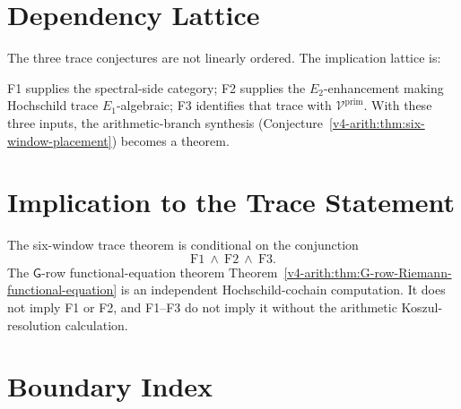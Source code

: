 \section{Dependency Lattice}
\label{v4-arith:of:dependency-graph}

The three trace conjectures are not linearly ordered. The implication
lattice is:
\begin{center}
\end{center}
F1 supplies the spectral-side category; F2 supplies the
\(E_{2}\)-enhancement making Hochschild trace \(E_{1}\)-algebraic; F3
identifies that trace with \(\mathcal{V}^{\mathrm{prim}}\). With these
three inputs, the arithmetic-branch synthesis
(Conjecture~\ref{v4-arith:thm:six-window-placement}) becomes a theorem.

\section{Implication to the Trace Statement}
\label{v4-arith:of:chain-of-implications}

The six-window trace theorem is conditional on the conjunction
\[
\mathrm{F1}\ \wedge\ \mathrm{F2}\ \wedge\ \mathrm{F3}.
\]
The \(\mathsf{G}\)-row functional-equation theorem
Theorem~\ref{v4-arith:thm:G-row-Riemann-functional-equation} is an
independent Hochschild-cochain computation. It does not imply F1 or
F2, and F1--F3 do not imply it without the arithmetic
Koszul-resolution calculation.

\section{Boundary Index}
\label{v4-arith:of:summary}

